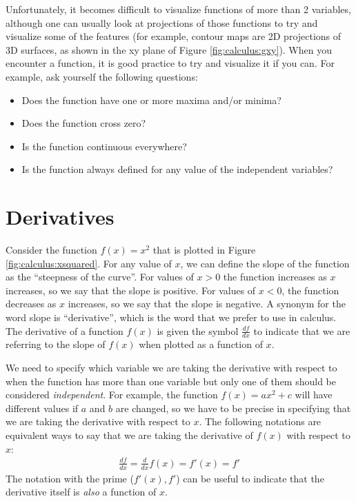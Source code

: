 Unfortunately, it becomes difficult to visualize functions of more than 2 variables, although one can usually look at projections of those functions to try and visualize some of the features (for example, contour maps are 2D projections of 3D surfaces, as shown in the xy plane of Figure \ref{fig:calculus:gxy}). When you encounter a function, it is good practice to try and visualize it if you can. For example, ask yourself the following questions:
\begin{itemize}
\item Does the function have one or more maxima and/or minima?
\item Does the function cross zero?
\item Is the function continuous everywhere?
\item Is the function always defined for any value of the independent variables?
\end{itemize} 

\section{Derivatives}
Consider the function $f(x)=x^2$ that is plotted in Figure \ref{fig:calculus:xsquared}. For any value of $x$, we can define the slope of the function as the ``steepness of the curve''. For values of $x>0$ the function increases as $x$ increases, so we say that the slope is positive. For values of $x<0$, the function decreases as $x$ increases, so we say that the slope is negative. A synonym for the word slope is ``derivative'', which is the word that we prefer to use in calculus. The derivative of a function $f(x)$ is given the symbol $\frac{df}{dx}$ to indicate that we are referring to the slope of $f(x)$ when plotted as a function of $x$. 

We need to specify which variable we are taking the derivative with respect to when the function has more than one variable but only one of them should be considered \textit{independent}. For example, the function $f(x)=ax^2+c$ will have different values if $a$ and $b$ are changed, so we have to be precise in specifying that we are taking the derivative with respect to $x$. The following notations are equivalent ways to say that we are taking the derivative of $f(x)$ with respect to $x$:
\begin{align*}
\frac{df}{dx}=\frac{d}{dx} f(x) = f'(x) = f'
\end{align*}
The notation with the prime ($f'(x),f'$) can be useful to indicate that the derivative itself is \textit{also} a function of $x$. 

